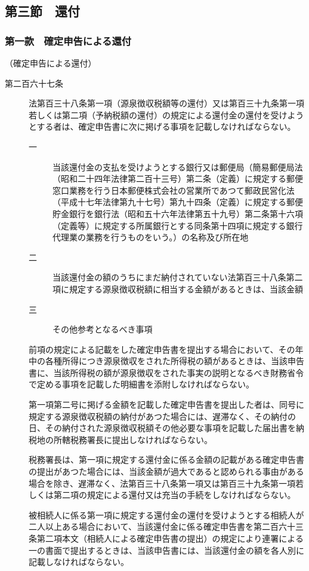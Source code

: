 \documentclass[twocolumn,a4j,10pt]{ltjtarticle}
\begin{document}
\subsection*{第三節　還付}
\subsubsection*{第一款　確定申告による還付}
\noindent\hspace{10pt}（確定申告による還付）
\begin{description}
\item[第二百六十七条]法第百三十八条第一項（源泉徴収税額等の還付）又は第百三十九条第一項若しくは第二項（予納税額の還付）の規定による還付金の還付を受けようとする者は、確定申告書に次に掲げる事項を記載しなければならない。
\begin{description}
\item[一]当該還付金の支払を受けようとする銀行又は郵便局（簡易郵便局法（昭和二十四年法律第二百十三号）第二条（定義）に規定する郵便窓口業務を行う日本郵便株式会社の営業所であつて郵政民営化法（平成十七年法律第九十七号）第九十四条（定義）に規定する郵便貯金銀行を銀行法（昭和五十六年法律第五十九号）第二条第十六項（定義等）に規定する所属銀行とする同条第十四項に規定する銀行代理業の業務を行うものをいう。）の名称及び所在地
\item[二]当該還付金の額のうちにまだ納付されていない法第百三十八条第二項に規定する源泉徴収税額に相当する金額があるときは、当該金額
\item[三]その他参考となるべき事項
\end{description}
\item[]前項の規定による記載をした確定申告書を提出する場合において、その年中の各種所得につき源泉徴収をされた所得税の額があるときは、当該申告書に、当該所得税の額が源泉徴収をされた事実の説明となるべき財務省令で定める事項を記載した明細書を添附しなければならない。
\item[]第一項第二号に掲げる金額を記載した確定申告書を提出した者は、同号に規定する源泉徴収税額の納付があつた場合には、遅滞なく、その納付の日、その納付された源泉徴収税額その他必要な事項を記載した届出書を納税地の所轄税務署長に提出しなければならない。
\item[]税務署長は、第一項に規定する還付金に係る金額の記載がある確定申告書の提出があつた場合には、当該金額が過大であると認められる事由がある場合を除き、遅滞なく、法第百三十八条第一項又は第百三十九条第一項若しくは第二項の規定による還付又は充当の手続をしなければならない。
\item[]被相続人に係る第一項に規定する還付金の還付を受けようとする相続人が二人以上ある場合において、当該還付金に係る確定申告書を第二百六十三条第二項本文（相続人による確定申告書の提出）の規定により連署による一の書面で提出するときは、当該申告書には、当該還付金の額を各人別に記載しなければならない。
\end{description}
\end{document}
